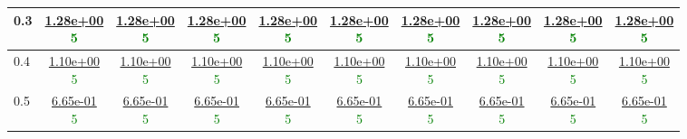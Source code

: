 \begin{table}[H]
\begin{tabular}{|l||c|c|c|c|c|c|c|c|c|}
\hline
 0.3 & \makecell{\ul{1.28e+00} \\ \textcolor{Green}{5}} & \makecell{\ul{1.28e+00} \\ \textcolor{Green}{5}} & \makecell{\ul{1.28e+00} \\ \textcolor{Green}{5}} & \makecell{\ul{1.28e+00} \\ \textcolor{Green}{5}} & \makecell{\ul{1.28e+00} \\ \textcolor{Green}{5}} & \makecell{\ul{1.28e+00} \\ \textcolor{Green}{5}} & \makecell{\ul{1.28e+00} \\ \textcolor{Green}{5}} & \makecell{\ul{1.28e+00} \\ \textcolor{Green}{5}} & \makecell{\ul{1.28e+00} \\ \textcolor{Green}{5}} \\
\hline
 0.4 & \makecell{\ul{1.10e+00} \\ \textcolor{Green}{5}} & \makecell{\ul{1.10e+00} \\ \textcolor{Green}{5}} & \makecell{\ul{1.10e+00} \\ \textcolor{Green}{5}} & \makecell{\ul{1.10e+00} \\ \textcolor{Green}{5}} & \makecell{\ul{1.10e+00} \\ \textcolor{Green}{5}} & \makecell{\ul{1.10e+00} \\ \textcolor{Green}{5}} & \makecell{\ul{1.10e+00} \\ \textcolor{Green}{5}} & \makecell{\ul{1.10e+00} \\ \textcolor{Green}{5}} & \makecell{\ul{1.10e+00} \\ \textcolor{Green}{5}} \\
\hline
 0.5 & \makecell{\ul{6.65e-01} \\ \textcolor{Green}{5}} & \makecell{\ul{6.65e-01} \\ \textcolor{Green}{5}} & \makecell{\ul{6.65e-01} \\ \textcolor{Green}{5}} & \makecell{\ul{6.65e-01} \\ \textcolor{Green}{5}} & \makecell{\ul{6.65e-01} \\ \textcolor{Green}{5}} & \makecell{\ul{6.65e-01} \\ \textcolor{Green}{5}} & \makecell{\ul{6.65e-01} \\ \textcolor{Green}{5}} & \makecell{\ul{6.65e-01} \\ \textcolor{Green}{5}} & \makecell{\ul{6.65e-01} \\ \textcolor{Green}{5}} \\

\end{tabular}
\end{table}
